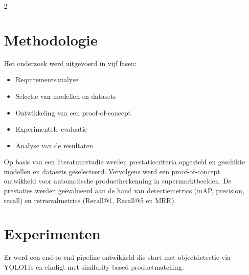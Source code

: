 \documentclass[a0,portrait]{hogent-poster}
\begin{document}
\begin{multicols}{2}
\section{Methodologie}
Het onderzoek werd uitgevoerd in vijf fasen:
\begin{itemize}
    \setlength{\itemsep}{0pt}
    \setlength{\parskip}{0pt}
    \setlength{\parsep}{0pt}  

    \item Requirementsanalyse 
    \item Selectie van modellen en datasets 
    \item Ontwikkeling van een proof-of-concept 
    \item Experimentele evaluatie 
    \item Analyse van de resultaten 
\end{itemize}
Op basis van een literatuurstudie werden prestatiecriteria opgesteld en geschikte modellen en datasets geselecteerd. Vervolgens werd een proof-of-concept ontwikkeld voor automatische productherkenning in supermarktbeelden. De prestaties werden geëvalueerd aan de hand van detectiemetrics (mAP, precision, recall) en retrievalmetrics (Recall@1, Recall@5 en MRR).

\section{Experimenten} 

Er werd een end-to-end pipeline ontwikkeld die start met objectdetectie via YOLO11s en eindigt met similarity-based productmatching. 
\break
{}
\end{multicols}
\end{document}

